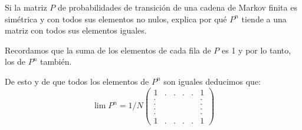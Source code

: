 \begin{problem}[4]
	Si la matriz $P$ de probabilidades de transición de una cadena de Markov finita es
	simétrica y con todos sus elementos no nulos, explica por qué $P^n$
	tiende a una matriz con
	todos sus elementos iguales.
	\solution

	Recordamos que la suma de los elementos de cada fila de $P$ es 1 y por lo tanto, los de $P^n$ también.

	De esto y de que todos los elementos de $P^n$ son iguales deducimos que:
	$$\lim P^n = 1/N \left(\begin{matrix}
	1&.&.&.&.&1\\
	.&&&&&.\\
	.&&&&&.\\
	.&&&&&.\\
	.&&&&&.\\
	1&.&.&.&.&1
	\end{matrix} \right)$$



\end{problem}

